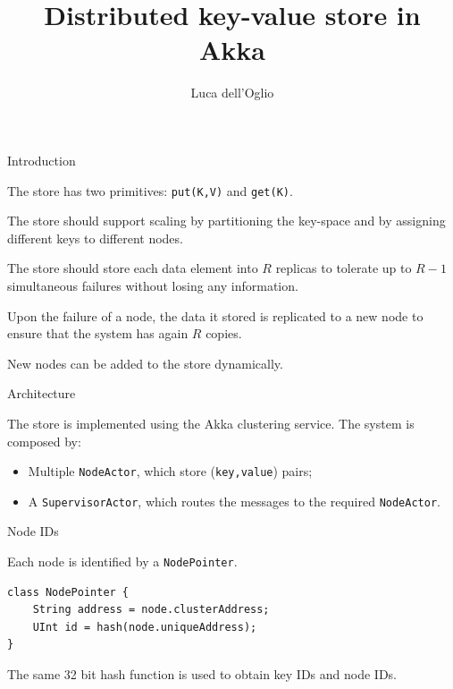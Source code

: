 \documentclass{beamer}
\title{Distributed key-value store in Akka}
\author{Luca dell'Oglio}
\institute{MTDS course, Politecnico di Milano}
\begin{document}
\setcounter{framenumber}{-1}

\begin{frame}[plain]
    \titlepage
\end{frame}

\begin{frame}{Introduction} \justify

    The store has two primitives: \texttt{put(K,V)} and \texttt{get(K)}.
    
    The store should support scaling by partitioning the key-space and by assigning different keys to different nodes.

    The store should store each data element into $R$ replicas to tolerate up to $R-1$ simultaneous failures without losing any information.
    
    Upon the failure of a node, the data it stored is replicated to a new node to ensure that the system has again $R$ copies.
 
    New nodes can be added to the store dynamically.
\end{frame}

\begin{frame}{Architecture} \justify
    
    The store is implemented using the Akka clustering service. The system is composed by:

    \begin{itemize}[label=$\bullet$]
        \item Multiple \texttt{NodeActor}, which store (\texttt{key,value}) pairs;
        \item A \texttt{SupervisorActor}, which routes the messages to the required \texttt{NodeActor}.
    \end{itemize}

\end{frame}

\begin{frame}[fragile]{Node IDs} \justify
    
    Each node is identified by a \texttt{NodePointer}.

    \begin{lstlisting}[escapechar=\°]
class NodePointer {
    String address = node.clusterAddress;
    UInt id = hash(node.uniqueAddress);
}
    \end{lstlisting}

The same 32 bit hash function is used to obtain key IDs and node IDs.

\end{frame}
\end{document}
